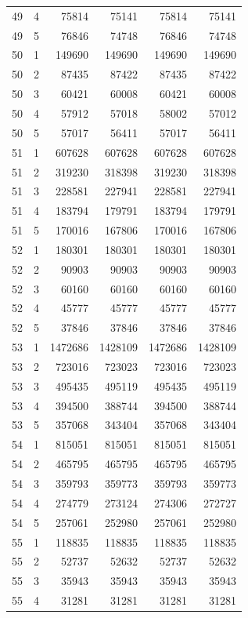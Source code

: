 \begin{longtable}{rrrrrr}
49 & 4 & 75814 & 75141 & 75814 & 75141 \\
49 & 5 & 76846 & 74748 & 76846 & 74748 \\
50 & 1 & 149690 & 149690 & 149690 & 149690 \\
50 & 2 & 87435 & 87422 & 87435 & 87422 \\
50 & 3 & 60421 & 60008 & 60421 & 60008 \\
50 & 4 & 57912 & 57018 & 58002 & 57012 \\
50 & 5 & 57017 & 56411 & 57017 & 56411 \\
51 & 1 & 607628 & 607628 & 607628 & 607628 \\
51 & 2 & 319230 & 318398 & 319230 & 318398 \\
51 & 3 & 228581 & 227941 & 228581 & 227941 \\
51 & 4 & 183794 & 179791 & 183794 & 179791 \\
51 & 5 & 170016 & 167806 & 170016 & 167806 \\
52 & 1 & 180301 & 180301 & 180301 & 180301 \\
52 & 2 & 90903 & 90903 & 90903 & 90903 \\
52 & 3 & 60160 & 60160 & 60160 & 60160 \\
52 & 4 & 45777 & 45777 & 45777 & 45777 \\
52 & 5 & 37846 & 37846 & 37846 & 37846 \\
53 & 1 & 1472686 & 1428109 & 1472686 & 1428109 \\
53 & 2 & 723016 & 723023 & 723016 & 723023 \\
53 & 3 & 495435 & 495119 & 495435 & 495119 \\
53 & 4 & 394500 & 388744 & 394500 & 388744 \\
53 & 5 & 357068 & 343404 & 357068 & 343404 \\
54 & 1 & 815051 & 815051 & 815051 & 815051 \\
54 & 2 & 465795 & 465795 & 465795 & 465795 \\
54 & 3 & 359793 & 359773 & 359793 & 359773 \\
54 & 4 & 274779 & 273124 & 274306 & 272727 \\
54 & 5 & 257061 & 252980 & 257061 & 252980 \\
55 & 1 & 118835 & 118835 & 118835 & 118835 \\
55 & 2 & 52737 & 52632 & 52737 & 52632 \\
55 & 3 & 35943 & 35943 & 35943 & 35943 \\
55 & 4 & 31281 & 31281 & 31281 & 31281 \\

\end{longtable}
